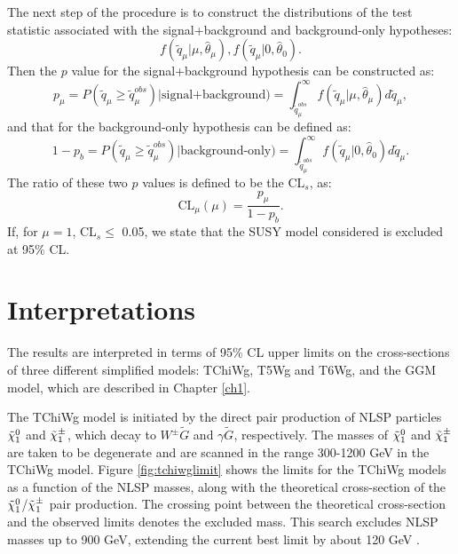 \documentclass[thesis.tex]{subfiles}
\renewcommand\_{\textunderscore\allowbreak}
\begin{document}
The next step of the procedure is to construct the distributions of the test statistic associated with the signal+background and background-only hypotheses: 
\begin{equation}
	f( \tilde{q}_\mu | \mu, \hat{\theta}_\mu), f( \tilde{q}_\mu | 0, \hat{\theta}_0).
\end{equation}
Then the $p$ value for the signal+background hypothesis can be constructed as:
\begin{equation}
	p_\mu = P( \tilde{q}_\mu \ge \tilde{q}_\mu^{obs}) | \text{signal+background}) = \int_{ \tilde{q}_\mu^{obs}}^\infty f( \tilde{q}_\mu | \mu, \hat{\theta}_\mu) d \tilde{q}_\mu,
\end{equation}
and that for the background-only hypothesis can be defined as:
\begin{equation}
	1- p_b = P( \tilde{q}_\mu \ge \tilde{q}_\mu^{obs}) | \text{background-only}) = \int_{ \tilde{q}_\mu^{obs}}^\infty f( \tilde{q}_\mu | 0, \hat{\theta}_0) d \tilde{q}_\mu. 
\end{equation}
The ratio of these two $p$ values is defined to be the CL$_s$, as:
\begin{equation}
	\text{CL}_\mu(\mu) = \frac{p_\mu}{1-p_b}.
\end{equation}
If, for $\mu = 1$, CL$_s \le $ 0.05, we state that the SUSY model considered is excluded at 95\% CL. 


\section{Interpretations}

The results are interpreted in terms of 95\% CL upper limits on the cross-sections of three different simplified models: TChiWg, T5Wg and T6Wg, and the GGM model, which are described in Chapter \ref{ch1}. 

The TChiWg model is initiated by the direct pair production of NLSP particles $\tilde{\chi}_1^0$ and $\tilde{\chi}_1^\pm$, which decay to $W^\pm\tilde{G}$ and $\gamma\tilde{G}$, respectively.
The masses of $\tilde{\chi}_1^0$ and $\tilde{\chi}_1^\pm$ are taken to be degenerate and are scanned in the range 300-1200 GeV in the TChiWg model.  
Figure \ref{fig:tchiwglimit} shows the limits for the TChiWg models as a function of the NLSP masses, along with the theoretical cross-section of the $\tilde{\chi}_1^0$/$\tilde{\chi}_1^\pm$ pair production.
The crossing point between the theoretical cross-section and the observed limits denotes the excluded mass. 
This search excludes NLSP masses up to 900 GeV, extending the current best limit by about 120 GeV \cite{singlephotonMET}.
\end{document}
